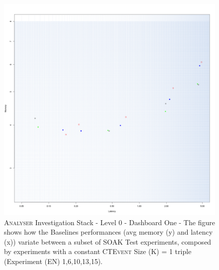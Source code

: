 \begin{figure}[h!tb]
	\centering
	\includegraphics[width=0.85\linewidth]{images/dashboard-1}	
	\caption[\textsc{Analyser} Investigation Stack - Level 0 - Dashboard One - Multiplot Version]{\textsc{Analyser} Investigation Stack - Level 0 - Dashboard One - The figure shows how the Baselines performances (avg memory (y) and latency (x)) variate between a subset of SOAK Test experiments, composed by experiments with a constant \textsc{CTEvent} Size (K) = 1 triple (Experiment (EN) 1,6,10,13,15).} %
	\label{fig:result_dashboard_kb}
\end{figure}

